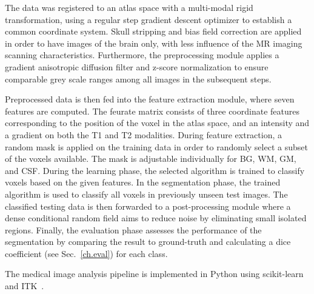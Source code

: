 \documentclass[journal]{IEEEtran}
\begin{document}
The data was registered to an atlas space with a multi-modal rigid transformation, using a regular step gradient descent optimizer to establish a common coordinate system. Skull stripping and bias field correction are applied in order to have images of the brain only, with less influence of the MR imaging scanning characteristics. Furthermore, the preprocessing module applies a gradient anisotropic diffusion filter and z-score normalization to ensure comparable grey scale ranges among all images in the subsequent steps.

Preprocessed data is then fed into the feature extraction module, where seven features are computed. The feurate matrix consists of three coordinate features corresponding to the position of the voxel in the atlas space, and an intensity and a gradient on both the T1 and T2 modalities. During feature extraction, a random mask is applied on the training data in order to randomly select a subset of the voxels available. The mask is adjustable individually for BG, WM, GM, and CSF. During the learning phase, the selected algorithm is trained to classify voxels based on the given features. In the segmentation phase, the trained algorithm is used to classify all voxels in previously unseen test images. The classified testing data is then forwarded to a post-processing module where a dense conditional random field \cite{krahenbuhl2011efficient} aims to reduce noise by eliminating small isolated regions. Finally, the evaluation phase assesses the performance of the segmentation by comparing the result to ground-truth and calculating a dice coefficient (see Sec.~\ref{ch.eval}) for each class.

The medical image analysis pipeline is implemented in Python using scikit-learn~\cite{pedregosa2011scikit} and ITK~\cite{yoo2002engineering}.
\end{document}
